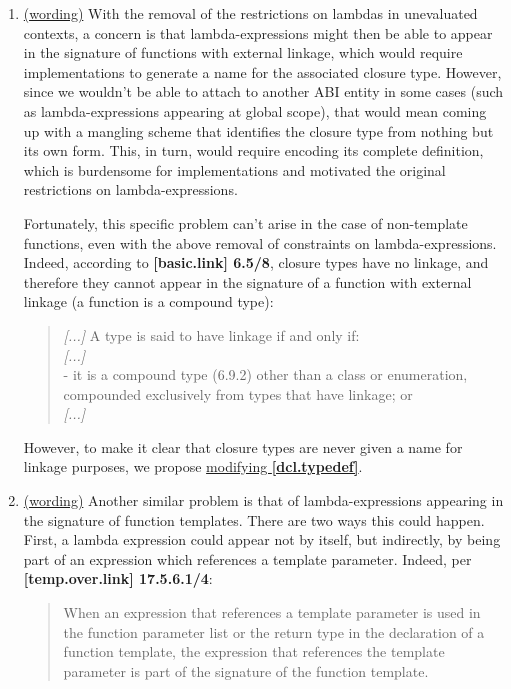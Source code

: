 \documentclass{wg21}
\begin{document}
\begin{enumerate}
  \item \label{discussion.non-template}
    \hyperref[wording.non-template]{(wording)}
    With the removal of the restrictions on lambdas in unevaluated contexts,
    a concern is that lambda-expressions might then be able to appear in the
    signature of functions with external linkage, which would require implementations
    to generate a name for the associated closure type. However, since we wouldn't
    be able to attach to another ABI entity in some cases (such as lambda-expressions
    appearing at global scope), that would mean coming up with a mangling scheme
    that identifies the closure type from nothing but its own form. This, in turn,
    would require encoding its complete definition, which is burdensome for
    implementations and motivated the original restrictions on lambda-expressions.

    Fortunately, this specific problem can't arise in the case of non-template
    functions, even with the above removal of constraints on lambda-expressions.
    Indeed, according to \textbf{[basic.link] 6.5/8}, closure types have no linkage,
    and therefore they cannot appear in the signature of a function with external
    linkage (a function is a compound type):
    \begin{quote}
      \textit{[...]} A type is said to have linkage if and only if:\\
      \textit{[...]}\\
      - it is a compound type (6.9.2) other than a class or enumeration,
        compounded exclusively from types that have linkage; or \\
      \textit{[...]}
    \end{quote}

    However, to make it clear that closure types are never given a name for
    linkage purposes, we propose \hyperref[wording.non-template]{modifying
    \textbf{[dcl.typedef]}}.


  \item \label{discussion.template}
    \hyperref[wording.template]{(wording)}
    Another similar problem is that of lambda-expressions appearing in the
    signature of function templates. There are two ways this could happen.
    First, a lambda expression could appear not by itself, but indirectly, by
    being part of an expression which references a template parameter. Indeed,
    per \textbf{[temp.over.link] 17.5.6.1/4}:
    \begin{quote}
      When an expression that references a template parameter is used in the
      function parameter list or the return type in the declaration of a function
      template, the expression that references the template parameter is part of
      the signature of the function template.
    \end{quote}


\end{enumerate}
\end{document}

